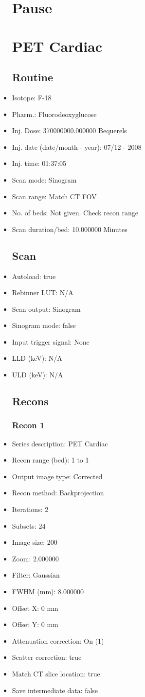 \documentclass[12pt]{article}
\begin{document}
\begin{itemize}
\section{Pause}
\section{PET Cardiac}\subsection{Routine}
\item Isotope: F-18
\item Pharm.: Fluorodeoxyglucose
\item Inj. Dose: 370000000.000000 Bequerels
\item Inj. date (date/month - year): 07/12 - 2008
\item Inj. time: 01:37:05
\item Scan mode: Sinogram
\item Scan range: Match CT FOV
\item No. of beds: Not given. Check recon range
\item Scan duration/bed: 10.000000 Minutes
\subsection{Scan}
\item Autoload: true
\item Rebinner LUT: N/A
\item Scan output: Sinogram
\item Sinogram mode: false
\item Input trigger signal: None
\item LLD (keV): N/A
\item ULD (keV): N/A
\subsection{Recons}
\subsubsection{Recon 1}
\item Series description: PET Cardiac
\item Recon range (bed): 1 to 1
\item Output image type: Corrected
\item Recon method: Backprojection
\item Iterations: 2
\item Subsets: 24
\item Image size: 200
\item Zoom: 2.000000
\item Filter: Gaussian
\item FWHM (mm): 8.000000
\item Offset X: 0 mm
\item Offset Y: 0 mm
\item Attenuation correction: On (1)
\item Scatter correction: true
\item Match CT slice location: true
\item Save intermediate data: false
\end{itemize}
\end{document}
